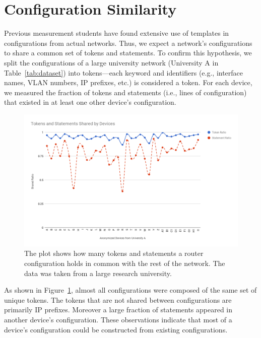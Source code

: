 \section{Configuration Similarity}
\label{sec:similarity}

Previous measurement students have found extensive use of templates in
configurations from actual networks. Thus, we expect a network's
configurations to share a common set of tokens and statements. To confirm this
hypothesis, we split the configurations of a large university network
(University A in Table~\ref{tab:dataset}) into tokens---each keyword and
identifiers (e.g., interface names, VLAN numbers, IP prefixes, etc.) is
considered a token. For each device, we measured the fraction of
tokens and statements (i.e., lines of configuration) that existed in at least
one other device's configuration.

\begin{figure}
	\centering
	\includegraphics[width=\columnwidth]{chart.png}
	\caption{The plot shows how many tokens and statements a router configuration holds in common with the rest of the network. The data was taken from a large research university.}
    \label{fig:chart}
\end{figure}

As shown in Figure~\ref{fig:chart}, almost all configurations were composed of
the same set of unique tokens. The tokens that are not shared between
configurations are primarily IP prefixes. Moreover a large fraction of
statements appeared in another device's configuration. These observations
indicate that most of a device's configuration could be constructed from
existing configurations.
